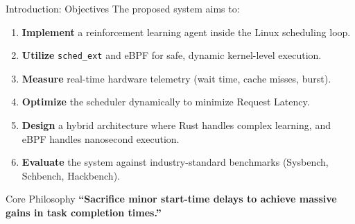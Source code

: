 \documentclass[aspectratio=169]{beamer}
\begin{document}
\begin{frame}{Introduction: Objectives}
The proposed system aims to:
\vspace{0.3cm}
\begin{enumerate}
  \item \textbf{Implement} a reinforcement learning agent inside the Linux scheduling loop.
  \item \textbf{Utilize} \texttt{sched\_ext} and eBPF for safe, dynamic kernel-level execution.
  \item \textbf{Measure} real-time hardware telemetry (wait time, cache misses, burst).
  \item \textbf{Optimize} the scheduler dynamically to minimize Request Latency.
  \item \textbf{Design} a hybrid architecture where Rust handles complex learning, and eBPF handles nanosecond execution.
  \item \textbf{Evaluate} the system against industry-standard benchmarks (Sysbench, Schbench, Hackbench).
\end{enumerate}
\vspace{0.3cm}
\begin{exampleblock}{Core Philosophy}
\centering\small
\textbf{``Sacrifice minor start-time delays to achieve massive gains in task completion times.''}
\end{exampleblock}
\end{frame}
\end{document}
